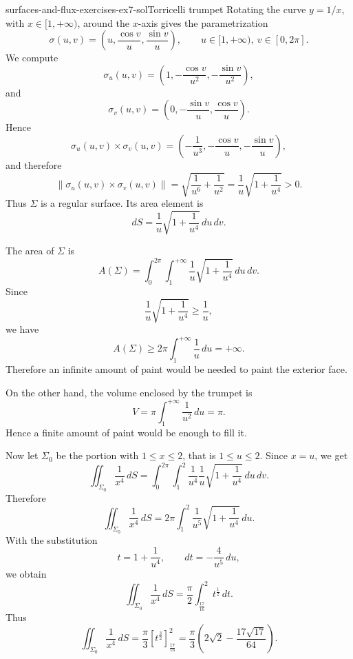 \documentclass[preview]{standalone}
\begin{document}
\begin{snippetsolution}{surfaces-and-flux-exercises-ex7-sol}{Torricelli trumpet}
    Rotating the curve \(y=1/x\), with \(x\in[1,+\infty)\), around the \(x\)-axis gives the parametrization
    \[
        \sigma(u,v)
        =
        \left(u,\frac{\cos v}{u},\frac{\sin v}{u}\right),
        \qquad
        u\in[1,+\infty),\ v\in[0,2\pi].
    \]
    We compute
    \[
        \sigma_u(u,v)
        =
        \left(1,-\frac{\cos v}{u^2},-\frac{\sin v}{u^2}\right),
    \]
    and
    \[
        \sigma_v(u,v)
        =
        \left(0,-\frac{\sin v}{u},\frac{\cos v}{u}\right).
    \]
    Hence
    \[
        \sigma_u(u,v)\times\sigma_v(u,v)
        =
        \left(
            -\frac{1}{u^3},
            -\frac{\cos v}{u},
            -\frac{\sin v}{u}
        \right),
    \]
    and therefore
    \[
        \|\sigma_u(u,v)\times\sigma_v(u,v)\|
        =
        \sqrt{\frac{1}{u^6}+\frac{1}{u^2}}
        =
        \frac{1}{u}\sqrt{1+\frac{1}{u^4}}>0.
    \]
    Thus \(\Sigma\) is a regular surface. Its area element is
    \[
        dS
        =
        \frac{1}{u}\sqrt{1+\frac{1}{u^4}}\,du\,dv.
    \]

    The area of \(\Sigma\) is
    \[
        A(\Sigma)
        =
        \int_0^{2\pi}\int_1^{+\infty}
        \frac{1}{u}\sqrt{1+\frac{1}{u^4}}
        \,du\,dv.
    \]
    Since
    \[
        \frac{1}{u}\sqrt{1+\frac{1}{u^4}}
        \geq
        \frac{1}{u},
    \]
    we have
    \[
        A(\Sigma)
        \geq
        2\pi\int_1^{+\infty}\frac{1}{u}\,du
        =
        +\infty.
    \]
    Therefore an infinite amount of paint would be needed to paint the exterior face.

    On the other hand, the volume enclosed by the trumpet is
    \[
        V
        =
        \pi\int_1^{+\infty}\frac{1}{u^2}\,du
        =
        \pi.
    \]
    Hence a finite amount of paint would be enough to fill it.

    Now let \(\Sigma_0\) be the portion with \(1\leq x\leq 2\), that is \(1\leq u\leq 2\). Since \(x=u\), we get
    \[
        \iint_{\Sigma_0}\frac{1}{x^4}\,dS
        =
        \int_0^{2\pi}\int_1^2
        \frac{1}{u^4}
        \frac{1}{u}\sqrt{1+\frac{1}{u^4}}
        \,du\,dv.
    \]
    Therefore
    \[
        \iint_{\Sigma_0}\frac{1}{x^4}\,dS
        =
        2\pi\int_1^2
        \frac{1}{u^5}\sqrt{1+\frac{1}{u^4}}
        \,du.
    \]
    With the substitution
    \[
        t=1+\frac{1}{u^4},
        \qquad
        dt=-\frac{4}{u^5}\,du,
    \]
    we obtain
    \[
        \iint_{\Sigma_0}\frac{1}{x^4}\,dS
        =
        \frac{\pi}{2}\int_{\frac{17}{16}}^2 t^{\frac12}\,dt.
    \]
    Thus
    \[
        \iint_{\Sigma_0}\frac{1}{x^4}\,dS
        =
        \frac{\pi}{3}
        \left[
            t^{\frac32}
        \right]_{\frac{17}{16}}^2
        =
        \frac{\pi}{3}
        \left(
            2\sqrt{2}-\frac{17\sqrt{17}}{64}
        \right).
    \]
\end{snippetsolution}
\end{document}
